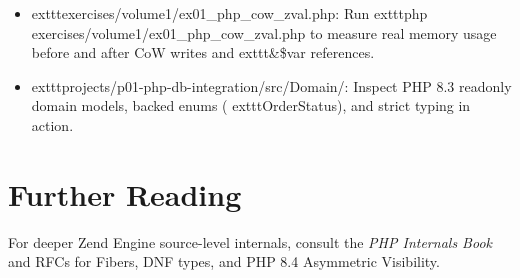 \begin{labbridgebox}
\begin{itemize}[leftmargin=15pt,itemsep=2pt]
  \item 	exttt{exercises/volume1/ex01\_php\_cow\_zval.php}: Run 	exttt{php exercises/volume1/ex01\_php\_cow\_zval.php} to measure real memory usage before and after CoW writes and 	exttt{\&\$var} references.
  \item 	exttt{projects/p01-php-db-integration/src/Domain/}: Inspect PHP 8.3 readonly domain models, backed enums (	exttt{OrderStatus}), and strict typing in action.
\end{itemize}
\end{labbridgebox}

\section*{Further Reading}
For deeper Zend Engine source-level internals, consult the \textit{PHP Internals Book} \cite{phpinternals} and RFCs for Fibers, DNF types, and PHP 8.4 Asymmetric Visibility.
